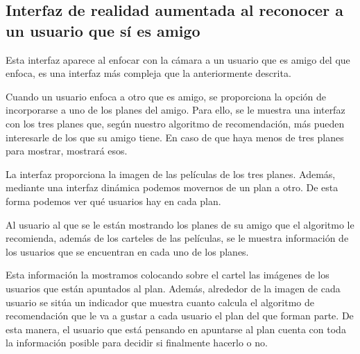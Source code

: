 \subsection{Interfaz de realidad aumentada al reconocer a un usuario que sí es amigo}
\label{makereference3.4.5.2}
Esta interfaz aparece al enfocar con la cámara a un usuario que es amigo del que enfoca, 
es una interfaz más compleja que la anteriormente descrita.

Cuando un usuario enfoca a otro que es amigo, se proporciona la opción de incorporarse a uno de los planes del
 amigo. Para ello, se le muestra una interfaz con los tres planes que, según nuestro algoritmo de recomendación,
  más pueden interesarle de los que su amigo tiene. En caso de que haya menos de tres planes para mostrar, mostrará esos.

La interfaz proporciona la imagen de las películas de los tres planes. Además, mediante una interfaz dinámica 
podemos movernos de un plan a otro. De esta forma podemos ver qué usuarios hay en cada plan.

Al usuario al que se le están mostrando los planes de su amigo que el algoritmo le recomienda, además de los carteles de las películas, se le muestra información de los usuarios que se encuentran en cada uno de los planes.

Esta información la mostramos colocando sobre el cartel las imágenes de los usuarios que están apuntados al plan. Además, alrededor de la imagen de cada usuario se sitúa un indicador que muestra cuanto calcula el algoritmo de recomendación que le va a gustar a cada usuario el plan del que forman parte. De esta manera, el usuario que está pensando en apuntarse al plan cuenta con toda la información posible para decidir si finalmente hacerlo o no.


